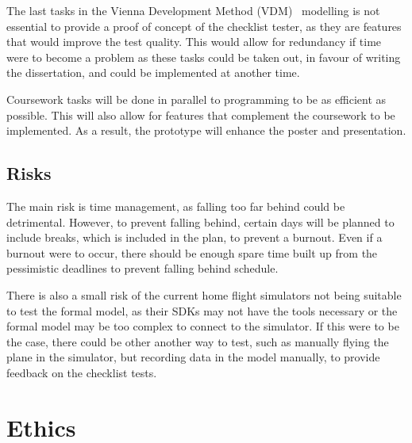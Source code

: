 \documentclass[a4paper, british]{article}
\begin{document}
The last tasks in the Vienna Development Method (VDM)~\cite{vdm} modelling 
is not essential to provide a proof of concept of the checklist tester,
as they are features that would improve the test quality. 
This would allow for redundancy if time were to become a problem 
as these tasks could be taken out, in favour of writing the dissertation,
and could be implemented at another time.

Coursework tasks will be done in parallel to programming to
be as efficient as possible. This will also allow for features that 
complement the coursework to be implemented. As a result, the 
prototype will enhance the poster and presentation.

\subsection{Risks}

The main risk is time management, as falling too far behind could 
be detrimental. However, to prevent falling behind, certain days 
will be planned to include breaks, which is included in the plan,
to prevent a burnout. Even if a burnout were to occur, there should be 
enough spare time built up from the pessimistic deadlines to 
prevent falling behind schedule. 

There is also a small risk of the current home flight simulators not 
being suitable to test the formal model, as their SDKs may not have 
the tools necessary or the formal model may be too complex to connect to 
the simulator. If this were to be the case, there could be other 
another way to test, such as manually flying the plane in the simulator, 
but recording data in the model manually, to provide feedback on the 
checklist tests.

\clearpage

\section{Ethics}
\end{document}
